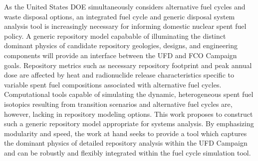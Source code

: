 As the United States \gls{DOE} simultaneously considers alternative fuel cycles 
and waste disposal options, an integrated fuel cycle and generic disposal system 
analysis tool is increasingly necessary for informing domestic nuclear spent 
fuel policy. A generic repository model capabable of illuminating the distinct 
dominant physics of candidate repository geologies, designs, and engineering 
components will provide an interface between the \gls{UFD} and \gls{FCO} Campaign 
goals. Repository metrics such as necessary repository footprint and peak annual 
dose are affected by heat and radionuclide release characteristics specific to 
variable spent fuel compositions associated  with alternative fuel cycles. 
Computational tools capable of simulating the dynamic, heterogeneous spent fuel 
isotopics resulting from transition scenarios and alternative fuel cycles 
are, however, lacking in repository modeling  options. This work proposes to 
construct such a generic repository model appropriate for systems analysis. By 
emphasizing modularity and speed, the work at hand seeks to  provide a tool 
which captures the dominant physics of detailed repository analysis within the 
\gls{UFD} Campaign and can be robustly and flexibly integrated within the 
\Cyclus fuel cycle simulation tool.

\glsresetall
